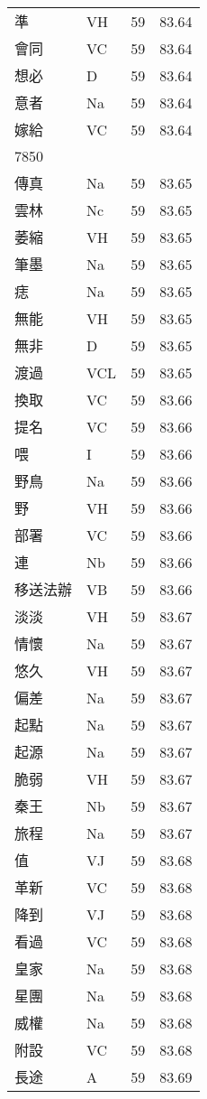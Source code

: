 \documentclass[twocolumn]{book}
\begin{document}
\begin{supertabular}{llrr}
準 & VH & 59 &  83.64\\
會同 & VC & 59 &  83.64\\
想必 & D & 59 &  83.64\\
意者 & Na & 59 &  83.64\\
嫁給 & VC & 59 &  83.64\\
7850\\
傳真 & Na & 59 &  83.65\\
雲林 & Nc & 59 &  83.65\\
萎縮 & VH & 59 &  83.65\\
筆墨 & Na & 59 &  83.65\\
痣 & Na & 59 &  83.65\\
無能 & VH & 59 &  83.65\\
無非 & D & 59 &  83.65\\
渡過 & VCL & 59 &  83.65\\
換取 & VC & 59 &  83.66\\
提名 & VC & 59 &  83.66\\
喂 & I & 59 &  83.66\\
野鳥 & Na & 59 &  83.66\\
野 & VH & 59 &  83.66\\
部署 & VC & 59 &  83.66\\
連 & Nb & 59 &  83.66\\
移送法辦 & VB & 59 &  83.66\\
淡淡 & VH & 59 &  83.67\\
情懷 & Na & 59 &  83.67\\
悠久 & VH & 59 &  83.67\\
偏差 & Na & 59 &  83.67\\
起點 & Na & 59 &  83.67\\
起源 & Na & 59 &  83.67\\
脆弱 & VH & 59 &  83.67\\
秦王 & Nb & 59 &  83.67\\
旅程 & Na & 59 &  83.67\\
值 & VJ & 59 &  83.68\\
革新 & VC & 59 &  83.68\\
降到 & VJ & 59 &  83.68\\
看過 & VC & 59 &  83.68\\
皇家 & Na & 59 &  83.68\\
星團 & Na & 59 &  83.68\\
威權 & Na & 59 &  83.68\\
附設 & VC & 59 &  83.68\\
長途 & A & 59 &  83.69\\

\end{supertabular}
\end{document}
